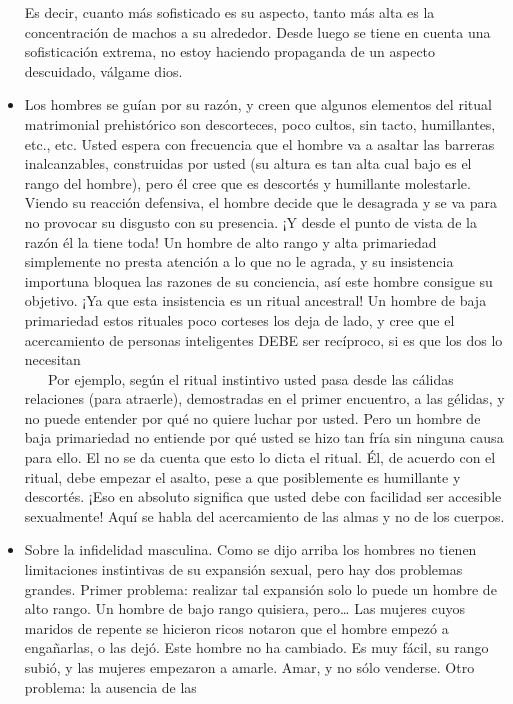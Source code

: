 \begin{itemize}
  Es decir, cuanto más sofisticado es su aspecto, tanto más alta es la
  concentración de machos a su alrededor. Desde luego se tiene en cuenta
  una sofisticación extrema, no estoy haciendo propaganda de un aspecto
  descuidado, válgame dios.
\item
  Los hombres se guían por su razón, y creen que algunos elementos del
  ritual matrimonial prehistórico son descorteces, poco cultos, sin
  tacto, humillantes, etc., etc. Usted espera con frecuencia que el
  hombre va a asaltar las barreras inalcanzables, construidas por usted
  (su altura es tan alta cual bajo es el rango del hombre), pero él cree
  que es descortés y humillante molestarle. Viendo su reacción
  defensiva, el hombre decide que le desagrada y se va para no provocar
  su disgusto con su presencia. ¡Y desde el punto de vista de la razón
  él la tiene toda! Un hombre de alto rango y alta primariedad
  simplemente no presta atención a lo que no le agrada, y su insistencia
  importuna bloquea las razones de su conciencia, así este hombre
  consigue su objetivo. ¡Ya que esta insistencia es un ritual ancestral!
  Un hombre de baja primariedad estos rituales poco corteses los deja de
  lado, y cree que el acercamiento de personas inteligentes DEBE ser
  recíproco, si es que los dos lo necesitan\\
  \hspace*{0.333em} ~ ~ Por ejemplo, según el ritual instintivo usted
  pasa desde las cálidas relaciones (para atraerle), demostradas en el
  primer encuentro, a las gélidas, y no puede entender por qué no quiere
  luchar por usted. Pero un hombre de baja primariedad no entiende por
  qué usted se hizo tan fría sin ninguna causa para ello. El no se da
  cuenta que esto lo dicta el ritual. Él, de acuerdo con el ritual, debe
  empezar el asalto, pese a que posiblemente es humillante y descortés.
  ¡Eso en absoluto significa que usted debe con facilidad ser accesible
  sexualmente! Aquí se habla del acercamiento de las almas y no de los
  cuerpos.
\item
  Sobre la infidelidad masculina. Como se dijo arriba los hombres no
  tienen limitaciones instintivas de su expansión sexual, pero hay dos
  problemas grandes. Primer problema: realizar tal expansión solo lo
  puede un hombre de alto rango. Un hombre de bajo rango quisiera,
  pero\ldots{} Las mujeres cuyos maridos de repente se hicieron ricos
  notaron que el hombre empezó a engañarlas, o las dejó. Este hombre no
  ha cambiado. Es muy fácil, su rango subió, y las mujeres empezaron a
  amarle. Amar, y no sólo venderse. Otro problema: la ausencia de las

\end{itemize}

